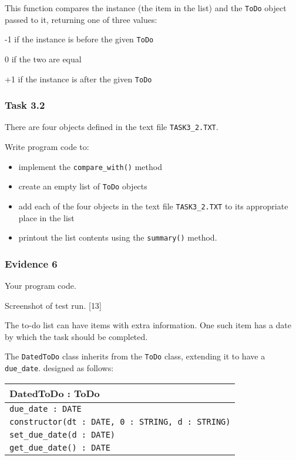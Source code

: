 This function compares the instance (the item in the list) and the
\texttt{ToDo} object passed to it, returning one of three values:

\texttt{\qquad{}}-1 if the instance is before the given \texttt{ToDo}

\texttt{\qquad{}}0 if the two are equal

\texttt{\qquad{}}+1 if the instance is after the given \texttt{ToDo}

\subsubsection*{Task 3.2}

There are four objects defined in the text file \texttt{TASK3\_2.TXT}.

Write program code to:
\begin{itemize}
\item implement the \texttt{compare\_with()} method
\item create an empty list of \texttt{ToDo} objects
\item add each of the four objects in the text file \texttt{TASK3\_2.TXT}
to its appropriate place in the list
\item printout the list contents using the \texttt{summary()} method.
\end{itemize}

\subsubsection*{Evidence 6}

Your program code.

Screenshot of test run. \hfill{}{[}13{]}

The to-do list can have items with extra information. One such item
has a date by which the task should be completed. 

The \texttt{DatedToDo} class inherits from the \texttt{ToDo} class,
extending it to have a \texttt{due\_date}. designed as follows: 
\begin{center}
\begin{tabular}{|l|}
\hline 
\hspace{0.25\columnwidth}DatedToDo : ToDo\tabularnewline
\hline 
\texttt{due\_date : DATE}\tabularnewline
\hline 
\texttt{constructor(dt : DATE, 0 : STRING, d : STRING)}\tabularnewline
\texttt{set\_due\_date(d : DATE)}\tabularnewline
\texttt{get\_due\_date() : DATE }\tabularnewline
\hline 
\end{tabular}
\par\end{center}

